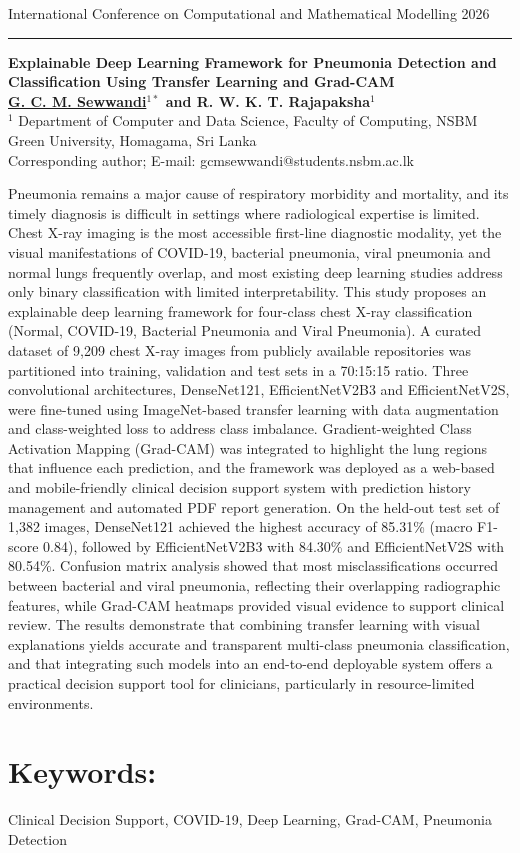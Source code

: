 \documentclass[twoside, 10pt, a4paper]{article}
\begin{document}
\pagestyle{empty}
\thispagestyle{empty}
\vspace{44pt}
\begin{center}
\begin{flushleft}
\footnotesize International Conference on Computational and Mathematical Modelling 2026
\end{flushleft}
\vspace{10pt}
\hrule
\vspace{15pt}
{ \bf{\large Explainable Deep Learning Framework for Pneumonia Detection and Classification Using Transfer Learning and Grad-CAM}}\\
\vspace{10pt}
{\bf \small \underline{G. C. M. Sewwandi}$^{1*}$ and R. W. K. T. Rajapaksha$^{1}$}\\
$^{1}$ \small Department of Computer and Data Science, Faculty of Computing, NSBM Green University, Homagama, Sri Lanka\\
\small *Corresponding author; E-mail: gcmsewwandi@students.nsbm.ac.lk\\
\end{center}

\vspace{12pt}

\indent Pneumonia remains a major cause of respiratory morbidity and mortality, and its timely diagnosis is difficult in settings where radiological expertise is limited. Chest X-ray imaging is the most accessible first-line diagnostic modality, yet the visual manifestations of COVID-19, bacterial pneumonia, viral pneumonia and normal lungs frequently overlap, and most existing deep learning studies address only binary classification with limited interpretability. This study proposes an explainable deep learning framework for four-class chest X-ray classification (Normal, COVID-19, Bacterial Pneumonia and Viral Pneumonia). A curated dataset of 9,209 chest X-ray images from publicly available repositories was partitioned into training, validation and test sets in a 70:15:15 ratio. Three convolutional architectures, DenseNet121, EfficientNetV2B3 and EfficientNetV2S, were fine-tuned using ImageNet-based transfer learning with data augmentation and class-weighted loss to address class imbalance. Gradient-weighted Class Activation Mapping (Grad-CAM) was integrated to highlight the lung regions that influence each prediction, and the framework was deployed as a web-based and mobile-friendly clinical decision support system with prediction history management and automated PDF report generation. On the held-out test set of 1,382 images, DenseNet121 achieved the highest accuracy of 85.31\% (macro F1-score 0.84), followed by EfficientNetV2B3 with 84.30\% and EfficientNetV2S with 80.54\%. Confusion matrix analysis showed that most misclassifications occurred between bacterial and viral pneumonia, reflecting their overlapping radiographic features, while Grad-CAM heatmaps provided visual evidence to support clinical review. The results demonstrate that combining transfer learning with visual explanations yields accurate and transparent multi-class pneumonia classification, and that integrating such models into an end-to-end deployable system offers a practical decision support tool for clinicians, particularly in resource-limited environments.

\section*{Keywords:}
\small {Clinical Decision Support, COVID-19, Deep Learning, Grad-CAM, Pneumonia Detection}
\end{document}
